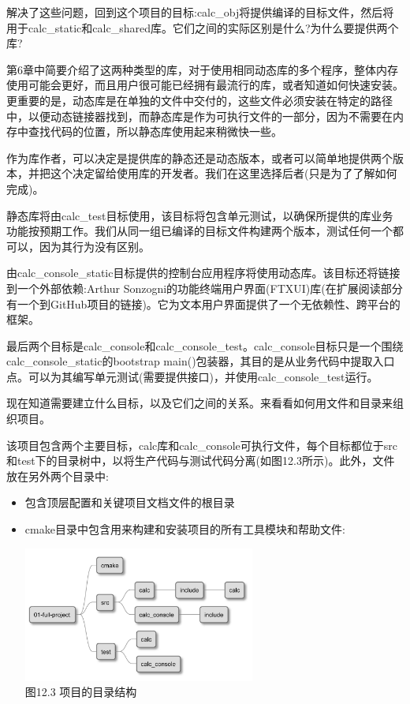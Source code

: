 解决了这些问题，回到这个项目的目标:calc\_obj将提供编译的目标文件，然后将用于calc\_static和calc\_shared库。它们之间的实际区别是什么?为什么要提供两个库?


第6章中简要介绍了这两种类型的库，对于使用相同动态库的多个程序，整体内存使用可能会更好，而且用户很可能已经拥有最流行的库，或者知道如何快速安装。更重要的是，动态库是在单独的文件中交付的，这些文件必须安装在特定的路径中，以便动态链接器找到，而静态库是作为可执行文件的一部分，因为不需要在内存中查找代码的位置，所以静态库使用起来稍微快一些。

作为库作者，可以决定是提供库的静态还是动态版本，或者可以简单地提供两个版本，并把这个决定留给使用库的开发者。我们在这里选择后者(只是为了了解如何完成)。

静态库将由calc\_test目标使用，该目标将包含单元测试，以确保所提供的库业务功能按预期工作。我们从同一组已编译的目标文件构建两个版本，测试任何一个都可以，因为其行为没有区别。

由calc\_console\_static目标提供的控制台应用程序将使用动态库。该目标还将链接到一个外部依赖:Arthur Sonzogni的功能终端用户界面(FTXUI)库(在扩展阅读部分有一个到GitHub项目的链接)。它为文本用户界面提供了一个无依赖性、跨平台的框架。

最后两个目标是calc\_console和calc\_console\_test。calc\_console目标只是一个围绕calc\_console\_static的bootstrap main()包装器，其目的是从业务代码中提取入口点。可以为其编写单元测试(需要提供接口)，并使用calc\_console\_test运行。

现在知道需要建立什么目标，以及它们之间的关系。来看看如何用文件和目录来组织项目。


该项目包含两个主要目标，calc库和calc\_console可执行文件，每个目标都位于src和test下的目录树中，以将生产代码与测试代码分离(如图12.3所示)。此外，文件放在另外两个目录中:

\begin{itemize}
\item 
包含顶层配置和关键项目文档文件的根目录

\item 
cmake目录中包含用来构建和安装项目的所有工具模块和帮助文件:

\begin{center}
\includegraphics[width=0.6\textwidth]{content/3/chapter12/images/3.jpg}\\
图12.3 项目的目录结构
\end{center}
\end{itemize}

